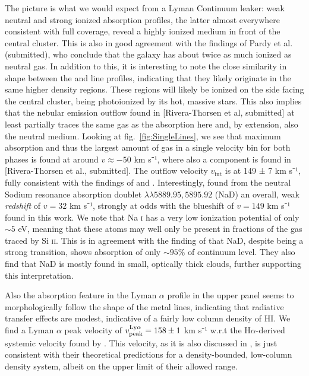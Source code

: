 \documentclass[twocolumn]{aastex61}
\begin{document}
The picture is what we would expect from a Lyman Continuum leaker: weak
neutral and strong ionized absorption profiles, the latter almost
everywhere consistent with full coverage, reveal a highly ionized medium
in front of the central cluster. This is also in good agreement with the
findings of Pardy et al. (submitted), who conclude that the galaxy has
about twice as much ionized as neutral gas. In addition to this, it is
interesting to note the close similarity in shape between the
 and  line profiles, indicating that they likely
originate in the same higher density regions. These regions will likely
be ionized on the side facing the central cluster, being photoionized by
its hot, massive stars. This also implies that the nebular emission
outflow found in {[}Rivera-Thorsen et al, submitted{]} at least
partially traces the same gas as the  absorption here and, by
extension, also the neutral medium. Looking at
fig.~\ref{fig:SingleLines}, we see that maximum absorption and thus the
largest amount of gas in a single velocity bin for both phases is found
at around $v \approx -50$ km s⁻¹, where also a component is found in
{[}Rivera-Thorsen et al., submitted{]}. The outflow velocity
$v_{\text{int}}$ is at 149 ± 7 km s⁻¹, fully consistent with the
findings of \citet{Heckman2015} and \citet{Alexandroff2015}.
Interestingly, \citet{Sandberg2013} found from the neutral Sodium
resonance absorption doublet $\lambda \lambda 5889.95,5895.92$ (NaD) an
overall, weak \emph{redshift} of $v = 32$ km s⁻¹, strongly at odds with
the blueshift of $v = 149$ km s⁻¹ found in this work. We note that Na
\textsc{i} has a very low ionization potential of only $\sim 5$ eV,
meaning that these atoms may well only be present in fractions of the
gas traced by Si \textsc{ii}. This is in agreement with the finding of
\citet{Sandberg2013} that NaD, despite being a strong transition, shows
absorption of only $\sim 95\%$ of continuum level. They also find that
NaD is mostly found in small, optically thick clouds, further supporting
this interpretation.

Also the absorption feature in the Lyman $\alpha$ profile in the upper
panel seems to morphologically follow the shape of the metal lines,
indicating that radiative transfer effects are modest, indicative of a
fairly low column density of HI. We find a Lyman $\alpha$ peak velocity
of $v_{\rm peak}^{\mathrm{Ly}\alpha} = 158 \pm 1$ km s⁻¹ w.r.t the
H$\alpha$-derived systemic velocity found by \citet{Sandberg2013}. This
velocity, as it is also discussed in \citet{Verhamme2015}, is just
consistent with their theoretical predictions for a density-bounded,
low-column density system, albeit on the upper limit of their allowed
range.
\end{document}
